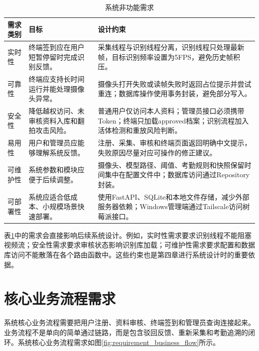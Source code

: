 \begin{table}[H]
    \centering
    \caption{系统非功能需求}
    \label{tab:nonfunctional_requirements}
    \begin{tabularx}{\textwidth}{p{3.2cm}p{4.1cm}X}
        \toprule
        \textbf{需求类别} & \textbf{目标} & \textbf{设计约束} \\
        \midrule
        实时性 & 终端签到应在用户短暂停留时完成识别反馈。 & 采集线程与识别线程分离，识别线程只处理最新帧，目标识别频率设置为5FPS，避免历史帧积压。 \\
        可靠性 & 终端应支持长时间运行并能处理摄像头异常。 & 摄像头打开失败或读帧失败时返回占位提示并尝试重连；数据库操作使用事务封装，避免部分写入。 \\
        安全性 & 降低越权访问、未审核资料入库和翻拍攻击风险。 & 普通用户仅访问本人资料；管理员接口必须携带Token；终端只加载approved档案；识别流程加入活体检测和重放风险判断。 \\
        易用性 & 用户和管理员应能够理解系统反馈。 & 注册、采集、审核和终端页面返回明确中文提示，失败原因尽量对应可操作的修正建议。 \\
        可维护性 & 系统参数和模块应便于后续调整。 & 摄像头、模型路径、阈值、考勤规则和快照保留时间集中在配置文件中；数据库访问通过Repository封装。 \\
        可部署性 & 系统应适合低成本、小规模场景快速部署。 & 使用FastAPI、SQLite和本地文件存储，减少外部服务器依赖；Windows管理端通过Tailscale访问树莓派接口。 \\
        \bottomrule
    \end{tabularx}
\end{table}

表\ref{tab:nonfunctional_requirements}中的需求会直接影响后续系统设计。例如，实时性需求要求识别线程不能阻塞视频流；安全性需求要求审核状态影响识别库加载；可维护性需求要求配置和数据库访问不能散落在各个路由函数中。这些约束也是第四章进行系统设计时的重要依据。

\section{核心业务流程需求}

系统核心业务流程需要把用户注册、资料审核、终端签到和管理员查询连接起来。业务流程不是单向的简单通过链路，而是包含驳回反馈、重新采集和考勤追溯的闭环。系统核心业务流程需求如图\ref{fig:requirement_business_flow}所示。

